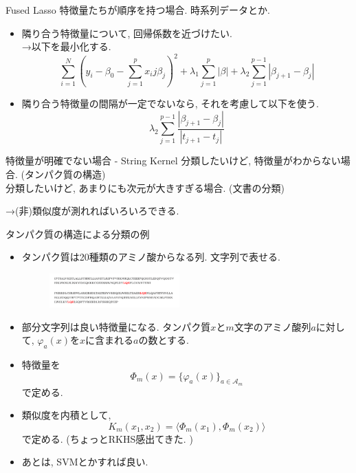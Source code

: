 \documentclass[dvipdfmx,8pt]{beamer}
\begin{document}
  \begin{frame}{Fused Lasso}
    特徴量たちが順序を持つ場合. 時系列データとか.
    \begin{itemize}
      \item 隣り合う特徴量について, 回帰係数を近づけたい. \\
        →以下を最小化する.
        \[
          \sum_{i=1}^N(y_i-\beta_0-\sum_{j=1}^px_ij\beta_j)^2+\lambda_1\sum_{j=1}^p|\beta|+\lambda_2\sum_{j=1}^{p-1}|\beta_{j+1}-\beta_j|
        \]
      \item 隣り合う特徴量の間隔が一定でないなら, それを考慮して以下を使う.
        \[
          \lambda_2\sum_{j=1}^{p-1}\frac{|\beta_{j+1}-\beta_j|}{|t_{j+1}-t_j|}
        \]
    \end{itemize}
  \end{frame}
  \begin{frame}{特徴量が明確でない場合 - String Kernel}
    分類したいけど, 特徴量がわからない場合. (タンパク質の構造)\\
    分類したいけど, あまりにも次元が大きすぎる場合. (文書の分類)

    →(非)類似度が測れればいろいろできる.

    \vspace{\baselineskip}

    タンパク質の構造による分類の例
    \begin{itemize}
      \item タンパク質は20種類のアミノ酸からなる列. 文字列で表せる.
        \begin{figure}
          \centering
          \includegraphics[width=5cm]{./images/protains.png}
        \end{figure}
      \item 部分文字列は良い特徴量になる. タンパク質$x$と$m$文字のアミノ酸列$a$に対して,
        $\varphi_a(x)$を$x$に含まれる$a$の数とする.
      \item 特徴量を
        \[
          \Phi_m(x)=\{\varphi_a(x)\}_{a\in\mathcal{A}_m}
        \]
        で定める.
      \item 類似度を内積として,
        \[
          K_m(x_1,x_2)=\langle\Phi_m(x_1),\Phi_m(x_2)\rangle
        \]
        で定める. (ちょっとRKHS感出てきた. )
      \item あとは, SVMとかすれば良い.
    \end{itemize}
  \end{frame}
\end{document}
